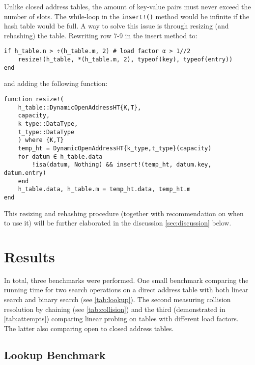 \documentclass[a4paper, 11pt]{article}
\begin{document}
    Unlike closed address tables, the 
    amount of key-value pairs must never exceed the number of slots. The
    while-loop in the \texttt{insert!()} method would be 
    infinite if the hash table would be full. 
    A way to solve this issue is through 
    resizing (and rehashing) the table. Rewriting row 7-9 in the insert method
    to:
    \begin{verbatim}
if h_table.n > ÷(h_table.m, 2) # load factor α > 1//2
    resize!(h_table, *(h_table.m, 2), typeof(key), typeof(entry))
end
    \end{verbatim}
    and adding the following function:
    \begin{verbatim}
function resize!(
    h_table::DynamicOpenAddressHT{K,T}, 
    capacity,
    k_type::DataType, 
    t_type::DataType
    ) where {K,T}
    temp_ht = DynamicOpenAddressHT{k_type,t_type}(capacity)
    for datum ∈ h_table.data
        !isa(datum, Nothing) && insert!(temp_ht, datum.key, datum.entry)
    end
    h_table.data, h_table.m = temp_ht.data, temp_ht.m
end
    \end{verbatim}

    This resizing and rehashing procedure (together with recommendation on when to use it) 
    will be further elaborated in the discussion \autoref{sec:discussion} below.


    \clearpage
    \section*{Results}
    \label{sec:results}
    In total, three benchmarks were performed. One small benchmark 
    comparing the running time for two search operations on a direct address table with both 
    linear search and binary search (see \autoref{tab:lookup}). The second 
    measuring collision resolution by chaining (see \autoref{tab:collision}) and
    the third (demonstrated in \autoref{tab:attempts})
    comparing linear probing on tables with different load factors. The latter also comparing open to 
    closed address tables. 
    
    \subsection*{Lookup Benchmark}
\end{document}
